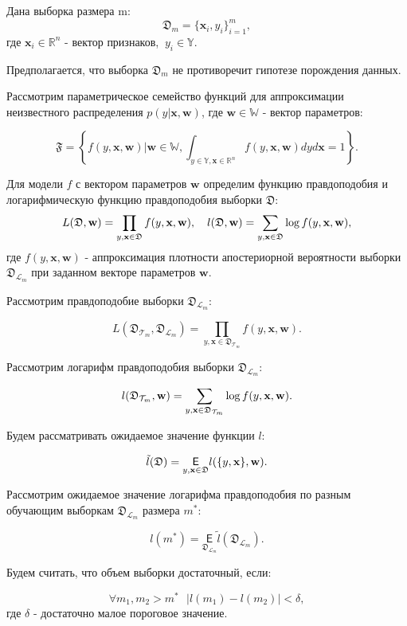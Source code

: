 \documentclass[12pt,twoside]{article}
\begin{document}
Дана выборка размера m:
$$
\mathfrak D_m = \{\textbf{x}_i, y_i\}_{i=1}^m,
$$
где $\textbf{x}_i \in \mathbb{R}^{n}$ - вектор признаков, $~y_i \in \mathbb{Y}$.

Предполагается, что выборка $\mathfrak D_m$ не противоречит гипотезе порождения данных.

Рассмотрим параметрическое семейство функций для аппроксимации неизвестного распределения $p(y | \textbf{x}, \textbf{w})$, где $\textbf{w} \in \mathbb{W}$ - вектор параметров:

$$
\mathfrak{F} = \left\{f(y, \textbf{x}, \textbf{w}) | \textbf{w} \in \mathbb{W}, \int_{y \in \mathbb{Y}, \textbf{x} \in \mathbb{R}^n} f(y, \textbf{x}, \textbf{w})dyd\textbf{x} = 1\right\}.
$$

Для модели $f$ с вектором параметров $\textbf{w}$ определим функцию правдоподобия и логарифмическую функцию правдоподобия выборки $\mathfrak D$:
$$
L(\mathfrak{D}, \textbf{w}) = \prod_{y, \textbf{x} \in \mathfrak D} f(y, \textbf{x}, \textbf{w}),~~~ l(\mathfrak D, \textbf w) = \sum_{y, \textbf{x} \in \mathfrak D}\log f(y, \textbf{x}, \textbf{w}),
$$
где $f(y, \textbf{x}, \textbf{w})$ - аппроксимация плотности апостериорной вероятности выборки $\mathfrak D_{\mathcal L_m}$ при заданном векторе параметров $\textbf{w}$.

Рассмотрим правдоподобие выборки $\mathfrak D_{\mathcal L_m}$:

$$
L(\mathfrak D_{\mathcal T_m}, \mathfrak D_{\mathcal L_m}) = \prod_{y, \textbf{x} \in \mathfrak D_{\mathcal T_m}} f(y, \textbf{x},  \textbf{w}).
$$

Рассмотрим логарифм правдоподобия выборки $\mathfrak D_{\mathcal L_m}$:

$$
l(\mathfrak D_{\mathcal T_m}, \textbf w) = \sum_{y, \textbf{x} \in \mathfrak D_{\mathcal T_m}}\log f(y, \textbf{x}, \textbf{w}).
$$

Будем рассматривать ожидаемое значение функции $l$:

$$
\tilde{l}(\mathfrak D)  = \underset{y, \textbf{x} \in \mathfrak D}{\mathsf E} l(\{y, \textbf{x}\}, \textbf w).
$$

Рассмотрим ожидаемое значение логарифма правдоподобия по разным обучающим выборкам $\mathfrak D_{\mathcal L_m}$ размера $m^*$:

$$
l(m^*) = \underset{\mathfrak D_{\mathcal L_m}}{\mathsf E} \tilde{l}(\mathfrak D_{\mathcal L_m}).
$$

Будем считать, что объем выборки достаточный, если:

$$
\forall m_1, m_2 > m^* ~~~ |l(m_1) - l(m_2)| < \delta,
$$
где $\delta$ - достаточно малое пороговое значение.
\end{document}
